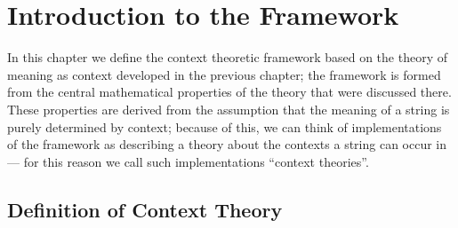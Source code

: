 
%

%


\section{Introduction to the Framework}


In this chapter we define the context theoretic framework based on the theory of meaning as context developed in the previous chapter; the framework is formed from the central mathematical properties of the theory that were discussed there. These properties are derived from the assumption that the meaning of a string is purely determined by context; because of this, we can think of implementations of the framework as describing a theory about the contexts a string can occur in --- for this reason we call such implementations ``context theories''.

\subsection{Definition of Context Theory}

